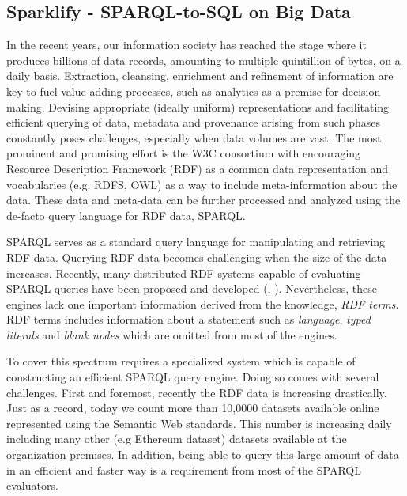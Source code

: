 \subsection{Sparklify - SPARQL-to-SQL on Big Data}
In the recent years, our information society has reached the stage where it produces billions of data records, amounting to multiple quintillion of bytes, on a daily basis.
Extraction, cleansing, enrichment and refinement of information are key to fuel value-adding processes, such as analytics as a premise for decision making.
Devising appropriate (ideally uniform) representations and facilitating efficient querying of data, metadata and provenance arising from such phases constantly poses challenges, especially when data volumes are vast. %
The most prominent and promising effort is the W3C consortium with encouraging Resource Description Framework (RDF) as a common data representation and vocabularies (e.g. RDFS, OWL) as a way to include meta-information about the data.
These data and meta-data can be further processed and analyzed using the de-facto query language for RDF data, SPARQL.

SPARQL serves as a standard query language for manipulating and retrieving RDF data.
Querying RDF data becomes challenging when the size of the data increases.
Recently, many distributed RDF systems capable of evaluating SPARQL queries have been proposed and developed (\cite{Schatzle:2016:SRQ:2977797.2977806}, \cite{sparqlgx-iswc-2016}).
Nevertheless, these engines lack one important information derived from the knowledge, \emph{RDF terms}.
RDF terms includes information about a statement such as \emph{language}, \emph{typed literals} and \emph{blank nodes} which are omitted from most of the engines.

To cover this spectrum requires a specialized system which is capable of constructing an efficient SPARQL query engine.
Doing so comes with several challenges.
First and foremost, recently the RDF data is increasing drastically.
Just as a record, today we count more than 10,0000 datasets available online represented using the Semantic Web standards.
This number is increasing daily including many other (e.g Ethereum dataset) datasets available at the organization premises.
In addition, being able to query this large amount of data in an efficient and faster way is a requirement from most of the SPARQL evaluators.

